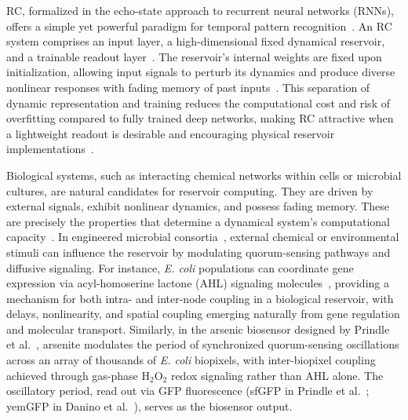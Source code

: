 \documentclass[journal=asbcd6,manuscript=article,keywords]{achemso}
\begin{document}
RC, formalized in the echo-state approach to recurrent neural networks (RNNs), offers a simple yet powerful paradigm for temporal pattern recognition~\cite{Jaeger2001,Zhang2023}. 
An RC system comprises an input layer, a high-dimensional fixed dynamical reservoir, and a trainable readout layer~\cite{Jaeger2001,Nakajima2020}. 
The reservoir's internal weights are fixed upon initialization, allowing input signals to perturb its dynamics and produce diverse nonlinear responses with fading memory of past inputs~\cite{Tanaka2019}. 
This separation of dynamic representation and training reduces the computational cost and risk of overfitting compared to fully trained deep networks, making RC attractive when a lightweight readout is desirable and encouraging physical reservoir implementations~\cite{Konkoli2018,Wang2024}.

Biological systems, such as interacting chemical networks within cells or microbial cultures, are natural candidates for reservoir computing. They are driven by external signals, exhibit nonlinear dynamics, and possess fading memory. These are precisely the properties that determine a dynamical system's computational capacity~\cite{Dambre2012}. 
In engineered microbial consortia~\cite{Scott2016}, external chemical or environmental stimuli can influence the reservoir by modulating quorum-sensing pathways and diffusive signaling.
For instance, \textit{E. coli} populations can coordinate gene expression via acyl-homoserine lactone (AHL) signaling molecules~\cite{Reading2006}, providing a mechanism for both intra- and inter-node coupling in a biological reservoir, with delays, nonlinearity, and spatial coupling emerging naturally from gene regulation and molecular transport. 
Similarly, in the arsenic biosensor designed by Prindle et al.~\cite{Prindle2011}, arsenite modulates the period of synchronized quorum-sensing oscillations across an array of thousands of \textit{E. coli} biopixels, with inter-biopixel coupling achieved through gas-phase H$_2$O$_2$ redox signaling rather than AHL alone. 
The oscillatory period, read out via GFP fluorescence (sfGFP in Prindle et al.~\cite{Prindle2011}; yemGFP in Danino et al.~\cite{Danino2010}), serves as the biosensor output.
\end{document}
